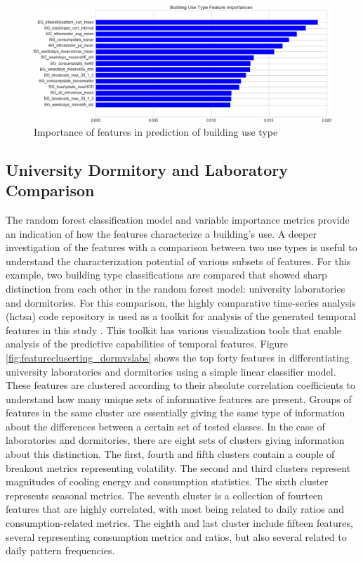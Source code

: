 \begin{figure}[ht!]
\begin{center}
\includegraphics[width=1\columnwidth]{figures/FeatureImportanceBuildingUseType1/FeatureImportanceBuildingUseType1}
\caption{{Importance of features in prediction of building use type
\label{sec:featureimportance_usetype}%
}}
\end{center}
\end{figure}

\subsection{University Dormitory and Laboratory Comparison}
\label{sec:dormvslab}

The random forest classification model and variable importance metrics provide an indication of how the features characterize a building's use. A deeper investigation of the features with a comparison between two use types is useful to understand the characterization potential of various subsets of features. For this example, two building type classifications are compared that showed sharp distinction from each other in the random forest model: university laboratories and dormitories. For this comparison, the highly comparative time-series analysis (hctsa) code repository is used as a toolkit for analysis of the generated temporal features in this study \cite{Fulcher_2013}. This toolkit has various visualization tools that enable analysis of the predictive capabilities of temporal features. Figure \ref{fig:featurecluserting_dormvslabs} shows the top forty features in differentiating university laboratories and dormitories using a simple linear classifier model. These features are clustered according to their absolute correlation coefficients to understand how many unique sets of informative features are present. Groups of features in the same cluster are essentially giving the same type of information about the differences between a certain set of tested classes. In the case of laboratories and dormitories, there are eight sets of clusters giving information about this distinction. The first, fourth and fifth clusters contain a couple of breakout metrics representing volatility. The second and third clusters represent magnitudes of cooling energy and consumption statistics. The sixth cluster represents seasonal metrics. The seventh cluster is a collection of fourteen features that are highly correlated, with most being related to daily ratios and consumption-related metrics. The eighth and last cluster include fifteen features, several representing consumption metrics and ratios, but also several related to daily pattern frequencies.

